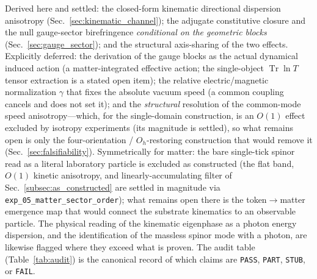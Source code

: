 Derived here and settled: the closed-form kinematic directional dispersion anisotropy
(Sec.~\ref{sec:kinematic_channel}); the adjugate constitutive closure and the null
gauge-sector birefringence \emph{conditional on the geometric blocks}
(Sec.~\ref{sec:gauge_sector}); and the structural axis-sharing of the two effects.
Explicitly deferred: the derivation of the gauge blocks as the actual dynamical
induced action (a matter-integrated effective action; the single-object
$\operatorname{Tr}\ln T$ tensor extraction is a stated open item); the relative
electric/magnetic normalization $\gamma$ that fixes the absolute vacuum speed (a
common coupling cancels and does not set it); and the \emph{structural} resolution of
the common-mode speed anisotropy---which, for the single-domain construction, is an
$O(1)$ effect excluded by isotropy experiments (its magnitude is settled), so what
remains open is only the four-orientation / $O_h$-restoring construction that would
remove it (Sec.~\ref{sec:falsifiability}). Symmetrically for matter: the bare
single-tick spinor read as a literal laboratory particle is excluded as constructed
(the flat band, $O(1)$ kinetic anisotropy, and linearly-accumulating filter of
Sec.~\ref{subsec:as_constructed} are settled in magnitude via
\texttt{exp\_05\_matter\_sector\_order}); what remains open there is the
token$\to$matter emergence map that would connect the substrate kinematics to an
observable particle.
The physical reading of the kinematic eigenphase as a photon energy dispersion, and
the identification of the massless spinor mode with a photon, are likewise flagged
where they exceed what is proven. The audit table (Table~\ref{tab:audit}) is the
canonical record of which claims are \texttt{PASS}, \texttt{PART}, \texttt{STUB}, or
\texttt{FAIL}.


